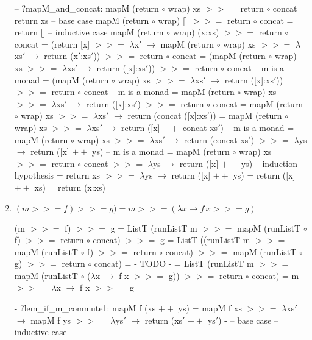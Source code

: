 \documentclass{article}
\newcommand{\hbind}{>\!\!\!>\!\!\!=}
\newcommand{\happend}{+\!\!\!+}
\begin{document}
\begin{enumerate}
\begin{code}
-- ?mapM_and_concat: mapM (return $\circ$ wrap) xs $\hbind$ return $\circ$ concat = return xs
-- base case
   mapM (return $\circ$ wrap) [] $\hbind$ return $\circ$ concat
= return []
-- inductive case
   mapM (return $\circ$ wrap) (x:xs) $\hbind$ return $\circ$ concat
= (return [x] $\hbind$ $\lambda$x$'$ $\to$ mapM (return $\circ$ wrap) xs $\hbind$ $\lambda$xs$'$ $\to$ return (x$'$:xs$'$)) $\hbind$ return $\circ$ concat
= (mapM (return $\circ$ wrap) xs $\hbind$ $\lambda$xs$'$ $\to$ return ([x]:xs$'$)) $\hbind$ return $\circ$ concat
-- m is a monad
= (mapM (return $\circ$ wrap) xs $\hbind$ $\lambda$xs$'$ $\to$ return ([x]:xs$'$)) $\hbind$ return $\circ$ concat
-- m is a monad
= mapM (return $\circ$ wrap) xs $\hbind$ $\lambda$xs$'$ $\to$ return ([x]:xs$'$) $\hbind$ return $\circ$ concat
= mapM (return $\circ$ wrap) xs $\hbind$ $\lambda$xs$'$ $\to$ return (concat ([x]:xs$'$))
= mapM (return $\circ$ wrap) xs $\hbind$ $\lambda$xs$'$ $\to$ return ([x] $\happend$ concat xs$'$)
-- m is a monad
= mapM (return $\circ$ wrap) xs $\hbind$ $\lambda$xs$'$ $\to$ return (concat xs$'$) $\hbind$ $\lambda$ys $\to$ return ([x] $\happend$ ys)
-- m is a monad
= mapM (return $\circ$ wrap) xs $\hbind$ return $\circ$ concat $\hbind$ $\lambda$ys $\to$ return ([x] $\happend$ ys)
-- induction hypothesis
= return xs $\hbind$ $\lambda$ys $\to$ return ([x] $\happend$ ys)
= return ([x] $\happend$ xs)
= return (x:xs)
\end{code}
\item $(m \hbind f) \hbind g) = m \hbind (\lambda x \to f\, x \hbind g)$
\begin{code}
   (m $\hbind$ f) $\hbind$ g
= ListT (runListT m $\hbind$ mapM (runListT $\circ$ f) $\hbind$ return $\circ$ concat) $\hbind$ g
= ListT ((runListT m $\hbind$ mapM (runListT $\circ$ f) $\hbind$ return $\circ$ concat) $\hbind$ mapM (runListT $\circ$ g) $\hbind$ return $\circ$ concat)
= {- TODO -}
= ListT (runListT m $\hbind$ mapM (runListT $\circ$ ($\lambda$x $\to$ f x $\hbind$ g)) $\hbind$ return $\circ$ concat)
= m $\hbind$ $\lambda$x $\to$ f x $\hbind$ g

{- ?lem_if_m_commute1:
       mapM f (xs $\happend$ ys)
    = mapM f xs $\hbind$ $\lambda$xs$'$ $\to$ mapM f ys $\hbind$ $\lambda$ys$'$ $\to$ return (xs$'$ $\happend$ ys$'$)
 -}
-- base case
-- inductive case


\end{code}
\end{enumerate}
\end{document}
